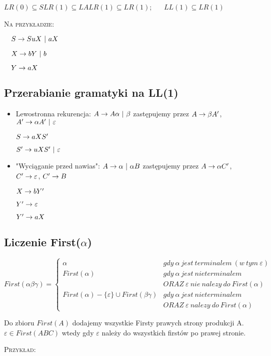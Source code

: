 $LR(0) \subseteq SLR(1) \subseteq LALR(1) \subseteq LR(1)$;  $\ \ \ \ \ $
$LL(1) \subseteq LR(1)$

\textsc{Na przykładzie:}

$\quad S \rightarrow SuX\ |\ aX$

$\quad X \rightarrow bY\ |\ b$

$\quad Y \rightarrow aX$


\subsection{Przerabianie gramatyki na LL(1)}
\begin{itemize}
    \item Lewostronna rekurencja: $A \rightarrow A \alpha\ |\ \beta$ zastępujemy przez $A \rightarrow \beta A'$, $A' \ra \alpha A'\ |\ \varepsilon$
    
    $S \rightarrow a X S'$
    
    $S' \ra uXS'\ |\ \varepsilon$
    \item "Wyciąganie przed nawias": $A \rightarrow \alpha\ |\ \alpha B$ zastępujemy przez $A \rightarrow \alpha C'$, $C' \rightarrow \varepsilon$, $C' \rightarrow B$
    
    $X \rightarrow bY'$
    
    $Y' \rightarrow \varepsilon$
    
    $Y' \rightarrow aX$
\end{itemize}


\subsection{Liczenie First($\alpha$)}

$First(\alpha\beta\gamma) = \left\{ 
    \begin{array}{ll} 
        \alpha & gdy\ \alpha\ jest\ terminalem\ (w\ tym\ \varepsilon) \\
        First(\alpha) & gdy\ \alpha\ jest\ nieterminalem\\ & ORAZ\ \varepsilon\ nie\ nalezy\ do\ First(\alpha) \\
        First(\alpha)-\{\varepsilon \} \cup First(\beta\gamma) & gdy\ \alpha\ jest\ nieterminalem\\ & ORAZ\ \varepsilon\ nalezy\ do\ First(\alpha)
    \end{array}
\right.$

Do zbioru $First(A)$ dodajemy wszystkie Firsty prawych strony produkcji A. $\varepsilon \in First(ABC)$ wtedy gdy $\varepsilon$ należy do wszystkich firstów po prawej stronie.

\textsc{Przykład}:


